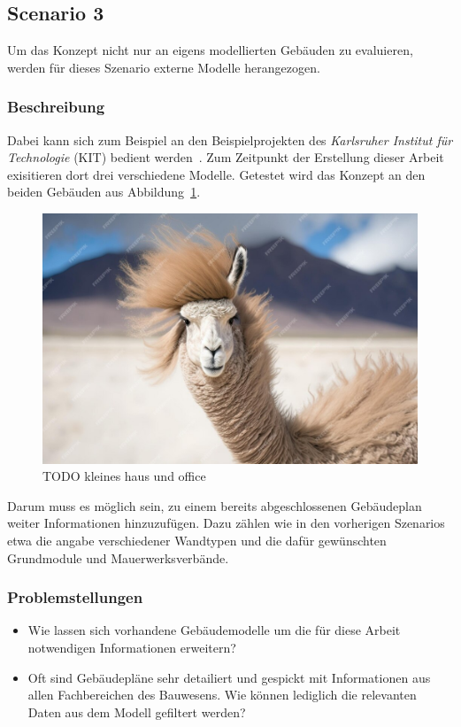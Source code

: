 \subsection{Scenario 3}\label{scenarios:scenario3}
Um das Konzept nicht nur an eigens modellierten Gebäuden zu evaluieren, werden für dieses Szenario externe Modelle herangezogen.
\subsubsection*{Beschreibung}
Dabei kann sich zum Beispiel an den Beispielprojekten des \textit{Karlsruher Institut für Technologie} (KIT) bedient werden~\cite{KITSAMPLEHOUSE:online}.
Zum Zeitpunkt der Erstellung dieser Arbeit exisitieren dort drei verschiedene Modelle.
Getestet wird das Konzept an den beiden Gebäuden aus Abbildung~\ref{fig:scenarios:Scenario3 KIT}.
\begin{figure}[!ht]
  \centering
  \includegraphics[width=0.6\columnwidth]{fig/TODO.jpg}
  \caption{TODO kleines haus und office}\label{fig:scenarios:Scenario3 KIT}
\end{figure}
Darum muss es möglich sein, zu einem bereits abgeschlossenen Gebäudeplan weiter Informationen hinzuzufügen.
Dazu zählen wie in den vorherigen Szenarios etwa die angabe verschiedener Wandtypen und die dafür gewünschten Grundmodule und Mauerwerksverbände.

\subsubsection*{Problemstellungen}
\begin{itemize}
  \item Wie lassen sich vorhandene Gebäudemodelle um die für diese Arbeit notwendigen Informationen erweitern?
  \item Oft sind Gebäudepläne sehr detailiert und gespickt mit Informationen aus allen Fachbereichen des Bauwesens. Wie können lediglich die relevanten Daten aus dem Modell gefiltert werden?
\end{itemize}

